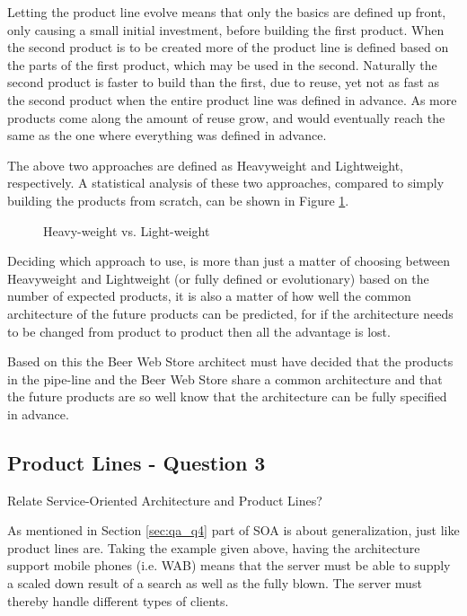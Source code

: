 Letting the product line evolve means that only the basics are defined up front, only causing a small initial investment, before building the first product. When the second product is to be created more of the product line is defined based on the parts of the first product, which may be used in the second. Naturally the second product is faster to build than the first, due to reuse, yet not as fast as the second product when the entire product line was defined in advance. As more products come along the amount of reuse grow, and would eventually reach the same as the one where everything was defined in advance.

The above two approaches are defined as Heavyweight and Lightweight, respectively. A statistical analysis of these two approaches, compared to simply building the products from scratch, can be shown in Figure \ref{fig:product-line}.

\clearpage

\begin{figure}[!htb]
\centerline{}
\caption{Heavy-weight vs. Light-weight}
\label{fig:product-line}
\end{figure}

Deciding which approach to use, is more than just a matter of choosing between Heavyweight and Lightweight (or fully defined or evolutionary) based on the number of expected products, it is also a matter of how well the common architecture of the future products can be predicted, for if the architecture needs to be changed from product to product then all the advantage is lost.

Based on this the Beer Web Store architect must have decided that the products in the pipe-line and the Beer Web Store share a common architecture and that the future products are so well know that the architecture can be fully specified in advance.

\subsection{Product Lines - Question 3}

\begin{question}
Relate Service-Oriented Architecture and Product Lines?
\end{question}

As mentioned in Section \ref{sec:qa_q4} part of SOA is about generalization, just like product lines are. Taking the example given above, having the architecture support mobile phones (i.e. WAB) means that the server must be able to supply a scaled down result of a search as well as the fully blown. The server must thereby handle different types of clients.

